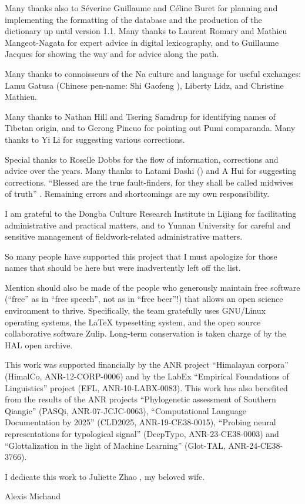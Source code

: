 Many thanks also to Séverine Guillaume and Céline Buret for planning and implementing the formatting of the database and the production of the dictionary up until version 1.1. Many thanks to Laurent Romary and Mathieu Mangeot-Nagata for expert advice in digital lexicography, and to Guillaume Jacques for showing the way and for advice along the path.

Many thanks to connoisseurs of the Na culture and language for useful exchanges: Lamu Gatusa  (Chinese pen-name: Shi Gaofeng ), Liberty Lidz, and Christine Mathieu.

Many thanks to Nathan Hill and Tsering Samdrup for identifying names of Tibetan origin, and to Gerong Pincuo  for pointing out Pumi comparanda. Many thanks to Yi Li  for suggesting various corrections.

Special thanks to Roselle Dobbs for the flow of information, corrections and advice over the years. Many thanks to Latami Dashi  () and A Hui  for suggesting corrections. ``Blessed are the true fault-finders, for they shall be called midwives of truth'' \parencite[vi]{yliniemi_descriptive_2022}. Remaining errors and shortcomings are my own responsibility.

I am grateful to the Dongba Culture Research Institute  in Lijiang for facilitating administrative and practical matters, and to Yunnan University for careful and sensitive management of fieldwork-related administrative matters.

So many people have supported this project that I must apologize for those names that should be here but were inadvertently left off the list.

Mention should also be made of the people who generously maintain free software (“free” as in “free speech”, not as in “free beer”!) that allows an open science environment to thrive. Specifically, the team gratefully uses GNU/Linux operating systems, the \LaTeX{} typesetting system, and the open source collaborative software Zulip. Long-term conservation is taken charge of by the HAL open archive.

This work was supported financially by the ANR project  “Himalayan corpora” (HimalCo, ANR-12-CORP-0006) and by the LabEx “Empirical Foundations of Linguistics” project (EFL, ANR-10-LABX-0083). This work has also benefited from the results of the ANR projects “Phylogenetic assessment of Southern Qiangic” (PASQi, ANR-07-JCJC-0063), “Computational Language Documentation by 2025” (CLD2025, ANR-19-CE38-0015), “Probing neural representations for typological signal” (DeepTypo, ANR-23-CE38-0003) and “Glottalization in the light of Machine Learning” (Glot-TAL, ANR-24-CE38-3766).

I dedicate this work to Juliette Zhao , my beloved wife.

{\raggedleft Alexis Michaud\par}
